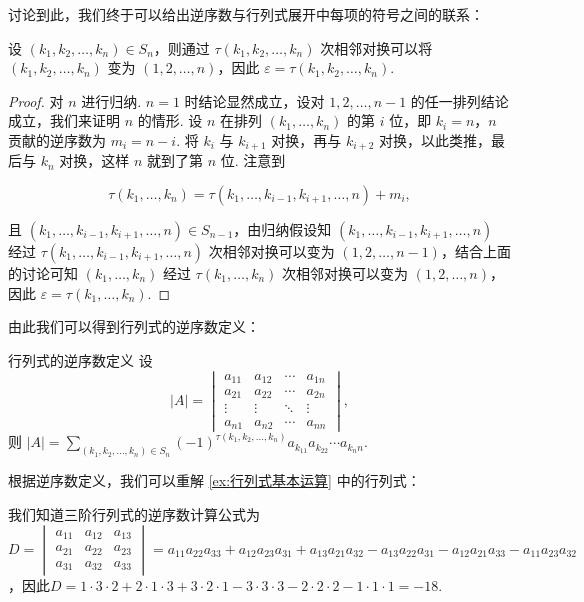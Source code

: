 讨论到此，我们终于可以给出逆序数与行列式展开中每项的符号之间的联系：

\begin{theorem}{}{}
    设 $(k_1,k_2,\ldots,k_n) \in S_n$，则通过 $\tau(k_1,k_2,\ldots,k_n)$ 次相邻对换可以将 $(k_1,k_2,\ldots,k_n)$ 变为 $(1,2,\ldots,n)$，因此 $\varepsilon = \tau(k_1,k_2,\ldots,k_n)$.
\end{theorem}

\begin{proof}
    对 $n$ 进行归纳. $n=1$ 时结论显然成立，设对 $1,2,\ldots,n-1$ 的任一排列结论成立，我们来证明 $n$ 的情形. 设 $n$ 在排列 $(k_1,\ldots,k_n)$ 的第 $i$ 位，即 $k_i = n$，$n$ 贡献的逆序数为 $m_i = n - i$. 将 $k_i$ 与 $k_{i+1}$ 对换，再与 $k_{i+2}$ 对换，以此类推，最后与 $k_n$ 对换，这样 $n$ 就到了第 $n$ 位. 注意到

    \[ \tau(k_1,\ldots,k_n) = \tau(k_1,\ldots,k_{i-1},k_{i+1},\ldots,n) + m_i,\]

    且 $(k_1,\ldots,k_{i-1},k_{i+1},\ldots,n) \in S_{n-1}$，由归纳假设知 $(k_1,\ldots,k_{i-1},k_{i+1},\ldots,n)$ 经过 $\tau(k_1,\ldots,k_{i-1},k_{i+1},\ldots,n)$ 次相邻对换可以变为 $(1,2,\ldots,n-1)$，结合上面的讨论可知 $(k_1,\ldots,k_n)$ 经过 $\tau(k_1,\ldots,k_n)$ 次相邻对换可以变为 $(1,2,\ldots,n)$，因此 $\varepsilon = \tau(k_1,\ldots,k_n)$.
\end{proof}

由此我们可以得到行列式的逆序数定义：

\begin{theorem}{行列式的逆序数定义}{}
    设
    \[|A| = \begin{vmatrix}
            a_{11} & a_{12} & \cdots & a_{1n} \\
            a_{21} & a_{22} & \cdots & a_{2n} \\
            \vdots & \vdots & \ddots & \vdots \\
            a_{n1} & a_{n2} & \cdots & a_{nn}
        \end{vmatrix},\]
    则 $|A| = \sum\limits_{(k_1,k_2,\ldots,k_n) \in S_n} (-1)^{\tau(k_1,k_2,\ldots,k_n)}a_{k_11}a_{k_22}\cdots a_{k_nn}$.
\end{theorem}

根据逆序数定义，我们可以重解 \autoref{ex:行列式基本运算} 中的行列式：
\begin{solution}
    我们知道三阶行列式的逆序数计算公式为 $D=\begin{vmatrix}
            a_{11} & a_{12} & a_{13} \\
            a_{21} & a_{22} & a_{23} \\
            a_{31} & a_{32} & a_{33}
        \end{vmatrix}=a_{11}a_{22}a_{33}+a_{12}a_{23}a_{31}+a_{13}a_{21}a_{32}-a_{13}a_{22}a_{31}-a_{12}a_{21}a_{33}-a_{11}a_{23}a_{32}$，因此$D=1 \cdot 3 \cdot 2+2 \cdot 1 \cdot 3+3 \cdot 2 \cdot 1-3 \cdot 3 \cdot 3-2 \cdot 2 \cdot 2-1 \cdot 1 \cdot 1=-18$.
\end{solution}

